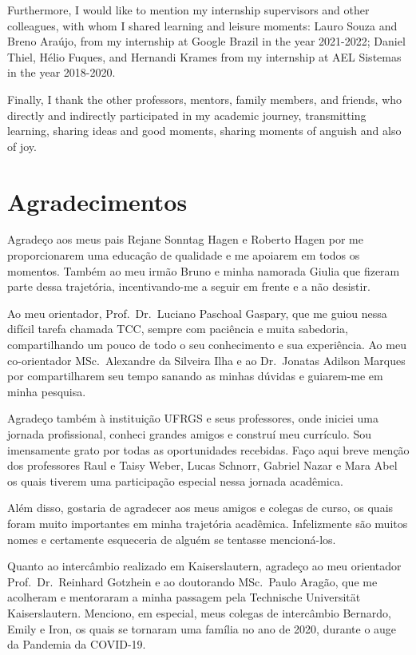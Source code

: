 Furthermore, I would like to mention my internship supervisors and other colleagues, with whom I shared learning and leisure moments: Lauro Souza and Breno Araújo, from my internship at Google Brazil in the year 2021-2022; Daniel Thiel, Hélio Fuques, and Hernandi Krames from my internship at AEL Sistemas in the year 2018-2020.

Finally, I thank the other professors, mentors, family members, and friends, who directly and indirectly participated in my academic journey, transmitting learning, sharing ideas and good moments, sharing moments of anguish and also of joy.

\chapter*{Agradecimentos}

Agradeço aos meus pais Rejane Sonntag Hagen e Roberto Hagen por me proporcionarem uma educação de qualidade e me apoiarem em todos os momentos. Também ao meu irmão Bruno e minha namorada Giulia que fizeram parte dessa trajetória, incentivando-me a seguir em frente e a não desistir.

Ao meu orientador, Prof.~Dr.~Luciano Paschoal Gaspary, que me guiou nessa difícil tarefa chamada TCC, sempre com paciência e muita sabedoria, compartilhando um pouco de todo o seu conhecimento e sua experiência. Ao meu co-orientador MSc.~Alexandre da Silveira Ilha e ao Dr.~Jonatas Adilson Marques por compartilharem seu tempo sanando as minhas dúvidas e guiarem-me em minha pesquisa.

Agradeço também à instituição UFRGS e seus professores, onde iniciei uma jornada profissional, conheci grandes amigos e construí meu currículo. Sou imensamente grato por todas as oportunidades recebidas. Faço aqui breve menção dos professores Raul e Taisy Weber, Lucas Schnorr, Gabriel Nazar e Mara Abel os quais tiverem uma participação especial nessa jornada acadêmica.

Além disso, gostaria de agradecer aos meus amigos e colegas de curso, os quais foram muito importantes em minha trajetória acadêmica. Infelizmente são muitos nomes e certamente esqueceria de alguém se tentasse mencioná-los.

Quanto ao intercâmbio realizado em Kaiserslautern, agradeço ao meu orientador Prof.~Dr.~Reinhard Gotzhein e ao doutorando MSc.~Paulo Aragão, que me acolheram e mentoraram a minha passagem pela Technische Universität Kaiserslautern. Menciono, em especial, meus colegas de intercâmbio Bernardo, Emily e Iron, os quais se tornaram uma família no ano de 2020, durante o auge da Pandemia da COVID-19.

